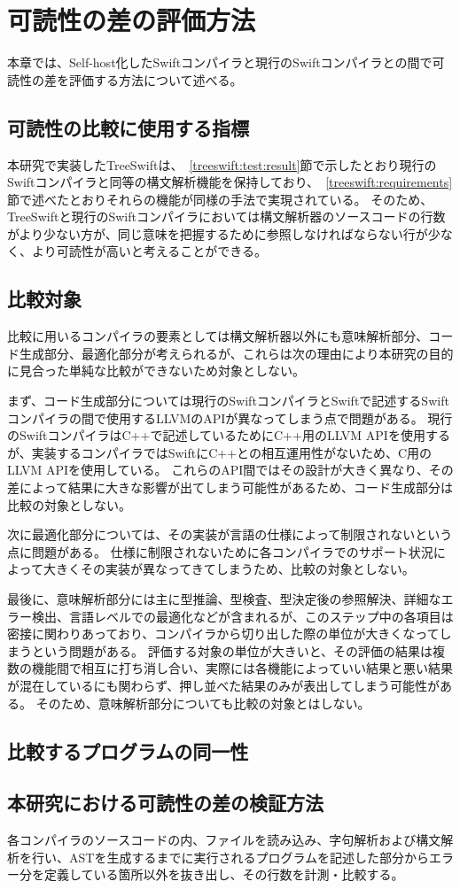 \chapter{可読性の差の評価方法}
\label{methodology}

本章では、Self-host化したSwiftコンパイラと現行のSwiftコンパイラとの間で可読性の差を評価する方法について述べる。


\section{可読性の比較に使用する指標}

本研究で実装したTreeSwiftは、~\ref{treeswift:test:result}節で示したとおり現行のSwiftコンパイラと同等の構文解析機能を保持しており、~\ref{treeswift:requirements}節で述べたとおりそれらの機能が同様の手法で実現されている。
そのため、TreeSwiftと現行のSwiftコンパイラにおいては構文解析器のソースコードの行数がより少ない方が、同じ意味を把握するために参照しなければならない行が少なく、より可読性が高いと考えることができる。

\section{比較対象}

比較に用いるコンパイラの要素としては構文解析器以外にも意味解析部分、コード生成部分、最適化部分が考えられるが、これらは次の理由により本研究の目的に見合った単純な比較ができないため対象としない。

まず、コード生成部分については現行のSwiftコンパイラとSwiftで記述するSwiftコンパイラの間で使用するLLVMのAPIが異なってしまう点で問題がある。
現行のSwiftコンパイラはC++で記述しているためにC++用のLLVM APIを使用するが、実装するコンパイラではSwiftにC++との相互運用性がないため、C用のLLVM APIを使用している。
これらのAPI間ではその設計が大きく異なり、その差によって結果に大きな影響が出てしまう可能性があるため、コード生成部分は比較の対象としない。

次に最適化部分については、その実装が言語の仕様によって制限されないという点に問題がある。
仕様に制限されないために各コンパイラでのサポート状況によって大きくその実装が異なってきてしまうため、比較の対象としない。

最後に、意味解析部分には主に型推論、型検査、型決定後の参照解決、詳細なエラー検出、言語レベルでの最適化などが含まれるが、このステップ中の各項目は密接に関わりあっており、コンパイラから切り出した際の単位が大きくなってしまうという問題がある。
評価する対象の単位が大きいと、その評価の結果は複数の機能間で相互に打ち消し合い、実際には各機能によっていい結果と悪い結果が混在しているにも関わらず、押し並べた結果のみが表出してしまう可能性がある。
そのため、意味解析部分についても比較の対象とはしない。

\section{比較するプログラムの同一性}

\section{本研究における可読性の差の検証方法}

各コンパイラのソースコードの内、ファイルを読み込み、字句解析および構文解析を行い、ASTを生成するまでに実行されるプログラムを記述した部分からエラー分を定義している箇所以外を抜き出し、その行数を計測・比較する。

